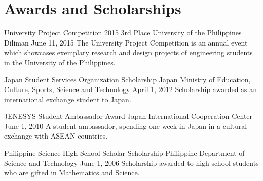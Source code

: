 \section*{Awards and Scholarships}

\award
	{University Project Competition 2015}
	{3rd Place}
	{University of the Philippines Diliman}
	{June 11, 2015}
	{The University Project Competition is an annual event which showcases exemplary research and design projects of engineering students in the University of the Philippines.}

\award
	{Japan Student Services Organization}
	{Scholarship}
	{Japan Ministry of Education, Culture, Sports, Science and Technology}
	{April 1, 2012}
	{Scholarship awarded as an international exchange student to Japan.}

\award
	{JENESYS Student Ambassador}
	{Award}
	{Japan International Cooperation Center}
	{June 1, 2010}
	{A student ambassador, spending one week in Japan in a cultural exchange with ASEAN countries.}

\award
	{Philippine Science High School Scholar}
	{Scholarship}
	{Philippine Department of Science and Technology}
	{June 1, 2006}
	{Scholarship awarded to high school students who are gifted in Mathematics and Science.}